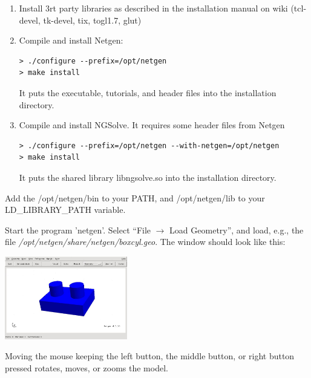\documentclass[20pt,landscape,footrule]{foils}
\newcommand\sectionname{}
\begin{document}
\foilhead{\color{blue}
{\bf Installing Netgen/NGSolve on Linux/Unix/Mac} \\}
%
\begin{enumerate}
\item Install 3rt party libraries as described in the installation manual on wiki (tcl-devel, tk-devel, tix, togl1.7, glut)
\item Compile and install Netgen:
\begin{verbatim}
> ./configure --prefix=/opt/netgen
> make install
\end{verbatim}
It puts the executable, tutorials, and header files into the installation directory.

\item Compile and install NGSolve. It requires some header files from Netgen
\begin{verbatim}
> ./configure --prefix=/opt/netgen --with-netgen=/opt/netgen
> make install
\end{verbatim}
It puts the shared library libngsolve.so into the installation directory.
\end{enumerate}
Add the /opt/netgen/bin to your PATH, and /opt/netgen/lib to your LD\_LIBRARY\_PATH variable.

\foilhead{\color{blue}
{\bf Running the Mesh Generator Netgen } \\}
%
\hypertarget{runnetgen}{}
\renewcommand\sectionname{Running Netgen}
Start the program 'netgen'. Select ``File $\rightarrow$ Load Geometry'', and load, e.g., the file {\em /opt/netgen/share/netgen/boxcyl.geo}. The window should look like this:

\begin{center}
\includegraphics[width=0.4\textwidth]{netgen-geometry.jpg} \\[2ex]
\end{center}

Moving the mouse keeping the left button, the middle button, or right button pressed rotates, moves, or zooms the model.
\end{document}
